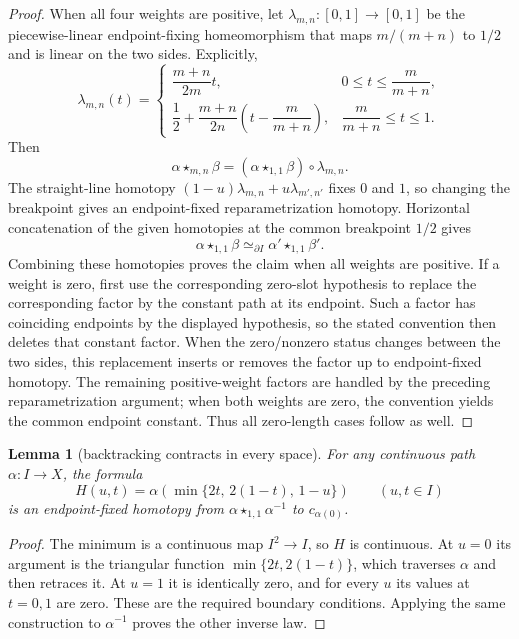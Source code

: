 \documentclass[10pt,reqno]{amsart}
\theoremstyle{definition}
\theoremstyle{plain}
\newtheorem{lemma}[definition]{Lemma}
\theoremstyle{remark}
\begin{document}
\begin{proof}
When all four weights are positive, let $\lambda_{m,n}:[0,1]\to[0,1]$ be
the piecewise-linear endpoint-fixing homeomorphism that maps
$m/(m+n)$ to $1/2$ and is linear on the two sides.  Explicitly,
\[
 \lambda_{m,n}(t)=
 \begin{cases}
   \dfrac{m+n}{2m}t,
     &0\leq t\leq\dfrac{m}{m+n},\\[6pt]
   \dfrac12+\dfrac{m+n}{2n}\left(t-\dfrac{m}{m+n}\right),
     &\dfrac{m}{m+n}\leq t\leq1.
 \end{cases}
\]
Then
\[
  \alpha\star_{m,n}\beta
  =(\alpha\star_{1,1}\beta)\circ\lambda_{m,n}.
\]
The straight-line homotopy $(1-u)\lambda_{m,n}+u\lambda_{m',n'}$ fixes $0$ and
$1$, so changing the breakpoint gives an endpoint-fixed reparametrization
homotopy.  Horizontal concatenation of the
given homotopies at the common breakpoint $1/2$ gives
\[
  \alpha\star_{1,1}\beta
  \simeq_{\partial I}
  \alpha'\star_{1,1}\beta'.
\]
Combining these homotopies proves the claim when all weights are positive.
If a weight is zero, first use the corresponding zero-slot hypothesis to replace
the corresponding factor by the constant path at its endpoint.  Such a factor
has coinciding endpoints by the displayed hypothesis, so the stated
convention then deletes that constant factor.  When the zero/nonzero status
changes between the two sides, this replacement inserts or removes the factor
up to endpoint-fixed homotopy.  The remaining positive-weight factors are
handled by the preceding reparametrization argument; when both weights are
zero, the convention yields the common endpoint constant.  Thus all
zero-length cases follow as well.
\end{proof}

\begin{lemma}[backtracking contracts in every space]
\label{lem:backtracking}
For any continuous path $\alpha:I\to X$, the formula
\[
 H(u,t)=\alpha\!\left(\min\{2t,\,2(1-t),\,1-u\}\right)
 \qquad (u,t\in I)
\]
is an endpoint-fixed homotopy from
$\alpha\star_{1,1}\alpha^{-1}$ to $c_{\alpha(0)}$.
\end{lemma}
\begin{proof}
The minimum is a continuous map $I^2\to I$, so $H$ is continuous.
At $u=0$ its argument is the triangular function
$\min\{2t,2(1-t)\}$, which traverses $\alpha$ and then retraces it.
At $u=1$ it is identically zero, and for every $u$ its values at
$t=0,1$ are zero.  These are the required boundary conditions.
Applying the same construction to $\alpha^{-1}$ proves the other inverse law.
\end{proof}
\end{document}
